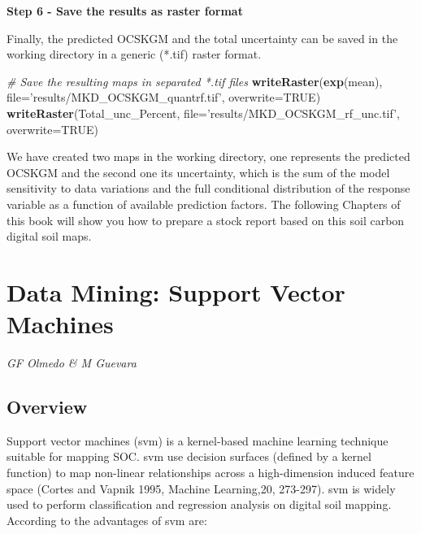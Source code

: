 \documentclass[10pt,b5paper,]{book}
\newenvironment{Shaded}{\begin{snugshade}}{\end{snugshade}}
\newcommand{\CommentTok}[1]{\textcolor[rgb]{0.56,0.35,0.01}{\textit{#1}}}
\newcommand{\DataTypeTok}[1]{\textcolor[rgb]{0.13,0.29,0.53}{#1}}
\newcommand{\KeywordTok}[1]{\textcolor[rgb]{0.13,0.29,0.53}{\textbf{#1}}}
\newcommand{\NormalTok}[1]{#1}
\newcommand{\OtherTok}[1]{\textcolor[rgb]{0.56,0.35,0.01}{#1}}
\newcommand{\StringTok}[1]{\textcolor[rgb]{0.31,0.60,0.02}{#1}}
\theoremstyle{definition}
\theoremstyle{definition}
\theoremstyle{definition}
\theoremstyle{remark}
\begin{document}
\textbf{Step 6 - Save the results as raster format}

Finally, the predicted OCSKGM and the total uncertainty can be saved in
the working directory in a generic (*.tif) raster format.

\begin{Shaded}
\begin{Highlighting}[]
\CommentTok{# Save the resulting maps in separated *.tif files}
\KeywordTok{writeRaster}\NormalTok{(}\KeywordTok{exp}\NormalTok{(mean), }\DataTypeTok{file=}\StringTok{'results/MKD_OCSKGM_quantrf.tif'}\NormalTok{, }
            \DataTypeTok{overwrite=}\OtherTok{TRUE}\NormalTok{)}
\KeywordTok{writeRaster}\NormalTok{(Total_unc_Percent, }\DataTypeTok{file=}\StringTok{'results/MKD_OCSKGM_rf_unc.tif'}\NormalTok{,}
            \DataTypeTok{overwrite=}\OtherTok{TRUE}\NormalTok{)}
\end{Highlighting}
\end{Shaded}

We have created two maps in the working directory, one represents the
predicted OCSKGM and the second one its uncertainty, which is the sum of
the model sensitivity to data variations and the full conditional
distribution of the response variable as a function of available
prediction factors. The following Chapters of this book will show you
how to prepare a stock report based on this soil carbon digital soil
maps.

\clearpage

\hypertarget{svm}{%
\section{Data Mining: Support Vector Machines}\label{svm}}

\emph{GF Olmedo \& M Guevara}

\hypertarget{overview-3}{%
\subsection{Overview}\label{overview-3}}

Support vector machines (svm) is a kernel-based machine learning
technique suitable for mapping SOC. svm use decision surfaces (defined
by a kernel function) to map non-linear relationships across a
high-dimension induced feature space (Cortes and Vapnik 1995, Machine
Learning,20, 273-297). svm is widely used to perform classification and
regression analysis on digital soil mapping. According to \citet{scikit}
the advantages of svm are:
\end{document}
